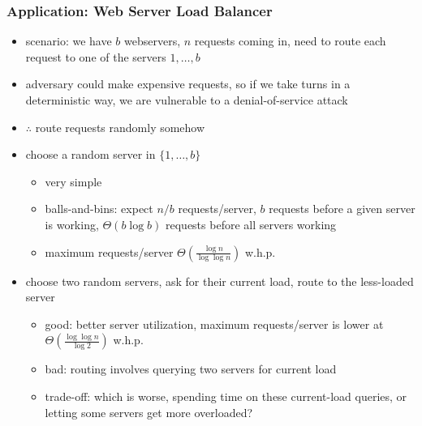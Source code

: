 \documentclass[10pt]{beamer}
\begin{document}
\begin{frame} \frametitle{Application: Web Server Load Balancer}
\begin{itemize}
  \item scenario: we have $b$ webservers, $n$ requests coming in, need to route
    each request to one of the servers $1, \ldots, b$
  \item adversary could make expensive requests, so if we take turns in a deterministic
    way, we are vulnerable to a denial-of-service attack
  \item $\therefore$ route requests randomly somehow
  \item choose a random server in $\{1, \ldots, b\}$
  \begin{itemize}
    \item very simple
    \item balls-and-bins: expect $n/b$ requests/server, $b$ requests before
      a given server is working, $\Theta(b \log b)$ requests before all servers
      working
    \item maximum requests/server $\Theta(\frac{\log n}{\log \log n}) $ w.h.p.
  \end{itemize}
  \item choose two random servers, ask for their current load, route to
    the less-loaded server
    \begin{itemize}
      \item good: better server utilization, maximum requests/server is lower
        at $\Theta(\frac{\log \log n}{\log 2})$ w.h.p.
      \item bad: routing involves querying two servers for current load
      \item trade-off: which is worse, spending time on these current-load
        queries, or letting some servers get more overloaded?
    \end{itemize}
\end{itemize}
\end{frame}
\end{document}

